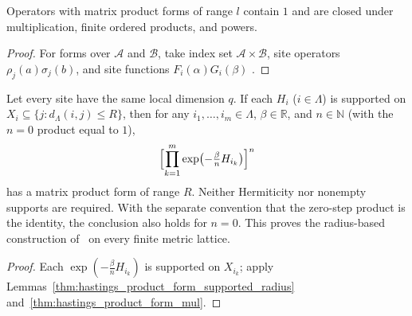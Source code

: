 \begin{lemma}
    \label{thm:hastings_product_form_mul}
    \leanok
    Operators with matrix product forms of range $l$ contain $1$ and are closed
    under multiplication, finite ordered products, and powers.
\end{lemma}
\begin{proof}\leanok
    For forms over $\mathcal A$ and $\mathcal B$, take index set
    $\mathcal A\times\mathcal B$, site operators $\rho_j(a)\sigma_j(b)$, and
    site functions $F_i(\alpha)G_i(\beta)$
    \cite[lines 1068--1077]{Hastings2006Solving}.
\end{proof}

\begin{lemma}
    \label{thm:hastings_trotter_product_form_radius}
    \leanok
    Let every site have the same local dimension $q$.
    If each $H_i$ ($i\in\Lambda$) is supported on
    $X_i\subseteq\{j:d_\Lambda(i,j)\le R\}$, then for any $i_1,\dots,i_m\in\Lambda$,
    $\beta\in\mathbb R$, and $n\in\mathbb N$ (with the $n=0$ product equal to $1$),
    \begin{align}
        \label{eq:hastings_trotter_product_radius}
        \Bigl[\prod_{k=1}^m\exp\bigl(-\tfrac\beta n H_{i_k}\bigr)\Bigr]^n
    \end{align}
    has a matrix product form of range $R$. Neither Hermiticity nor
    nonempty supports are required. With the separate convention that the
    zero-step product is the identity, the conclusion also holds for $n=0$.
    This proves the radius-based construction of~\cite[lines
        1053--1077]{Hastings2006Solving} on every finite metric lattice.
\end{lemma}
\begin{proof}\leanok
    Each $\exp(-\tfrac\beta nH_{i_k})$ is supported on $X_{i_k}$; apply
    Lemmas~\ref{thm:hastings_product_form_supported_radius}
    and~\ref{thm:hastings_product_form_mul}.
\end{proof}

